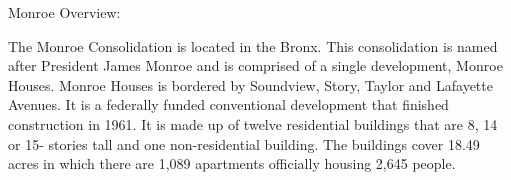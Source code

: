 Monroe Overview:    

  

The Monroe Consolidation is located in the Bronx. This consolidation is named after President James Monroe and is comprised of a single development, Monroe Houses. Monroe Houses is bordered by Soundview, Story, Taylor and Lafayette Avenues. It is a federally funded conventional development that finished construction in 1961. It is made up of twelve residential buildings that are 8, 14 or 15- stories tall and one non-residential building. The buildings cover 18.49 acres in which there are 1,089 apartments officially housing 2,645 people.   